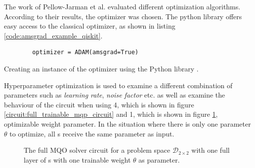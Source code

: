 The work of Pellow-Jarman et al.\cite{pellow-jarman_comparison_2021} evaluated different optimization algorithms. According to their results, the  optimizer was chosen. The python library  offers easy access to the classical optimizer, as shown in listing \ref{code:amsgrad_example_qiskit}.

\begin{listing}[!h]
    \centering
    \begin{verbatim}
        optimizer = ADAM(amsgrad=True)
    \end{verbatim}
    \caption{Creating an instance of the  optimizer using the Python library .}
    \label{code:amsgrad_example_qiskit}
\end{listing}

Hyperparameter optimization is used to examine a different combination of parameters such as \emph{learning rate}, \emph{noise factor} etc. as well as examine the behaviour of the circuit when using 4, which is shown in figure \ref{circuit:full_trainable_mqp_circuit} and 1, which is shown in figure \ref{circuit:full_trainable_mqp_circuit_1_w}, optimizable weight parameter. In the situation where there is only one parameter $\theta$ to optimize, all \rxgate s receive the same parameter as input.

\begin{figure}[!h]
    \centering
    \caption{The full MQO solver circuit for a problem space $\mathcal{D}_{2\times2}$ with one full layer of \rxgate s with one trainable weight $\theta$ as parameter.}
    \label{circuit:full_trainable_mqp_circuit_1_w}
\end{figure}


